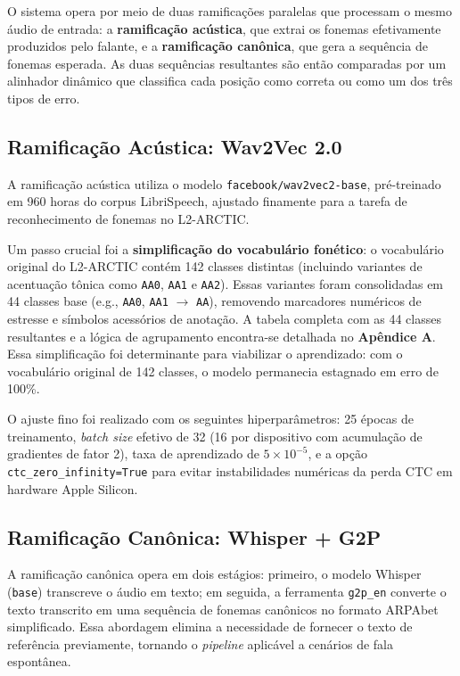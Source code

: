 \documentclass[12pt]{article}
\begin{document}
O sistema opera por meio de duas ramificações paralelas que processam o mesmo áudio de entrada: a \textbf{ramificação acústica}, que extrai os fonemas efetivamente produzidos pelo falante, e a \textbf{ramificação canônica}, que gera a sequência de fonemas esperada. As duas sequências resultantes são então comparadas por um alinhador dinâmico que classifica cada posição como correta ou como um dos três tipos de erro.

\subsection{Ramificação Acústica: Wav2Vec 2.0}

A ramificação acústica utiliza o modelo \texttt{facebook/wav2vec2-base}, pré-treinado em 960 horas do corpus LibriSpeech, ajustado finamente para a tarefa de reconhecimento de fonemas no L2-ARCTIC.

Um passo crucial foi a \textbf{simplificação do vocabulário fonético}: o vocabulário original do L2-ARCTIC contém 142 classes distintas (incluindo variantes de acentuação tônica como \texttt{AA0}, \texttt{AA1} e \texttt{AA2}). Essas variantes foram consolidadas em 44 classes base (e.g., \texttt{AA0}, \texttt{AA1} $\rightarrow$ \texttt{AA}), removendo marcadores numéricos de estresse e símbolos acessórios de anotação. A tabela completa com as 44 classes resultantes e a lógica de agrupamento encontra-se detalhada no \textbf{Apêndice A}. Essa simplificação foi determinante para viabilizar o aprendizado: com o vocabulário original de 142 classes, o modelo permanecia estagnado em erro de 100\%.

O ajuste fino foi realizado com os seguintes hiperparâmetros: 25 épocas de treinamento, \textit{batch size} efetivo de 32 (16 por dispositivo com acumulação de gradientes de fator 2), taxa de aprendizado de $5 \times 10^{-5}$, e a opção \texttt{ctc\_zero\_infinity=True} para evitar instabilidades numéricas da perda CTC em hardware Apple Silicon.

\subsection{Ramificação Canônica: Whisper + G2P}

A ramificação canônica opera em dois estágios: primeiro, o modelo Whisper (\texttt{base}) transcreve o áudio em texto; em seguida, a ferramenta \texttt{g2p\_en} converte o texto transcrito em uma sequência de fonemas canônicos no formato ARPAbet simplificado. Essa abordagem elimina a necessidade de fornecer o texto de referência previamente, tornando o \textit{pipeline} aplicável a cenários de fala espontânea.
\end{document}
